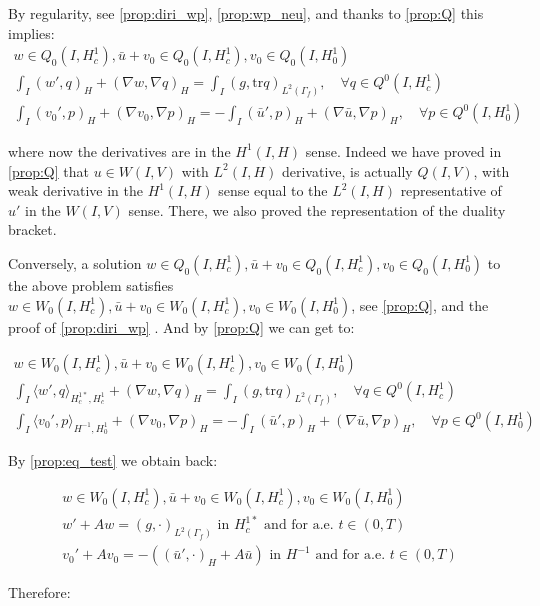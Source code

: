 \documentclass[english,a4paper,12pt,oneside]{scrbook}
\theoremstyle{break}
\theoremstyle{remark}
\newcommand{\tr}{\text{tr}}
\begin{document}
By regularity, see \cref{prop:diri_wp}, \cref{prop:wp_neu}, and thanks to \cref{prop:Q} this implies:
\begin{align*}
w \in Q_0(I, H^1_c), \bar{u}+v_0 \in Q_0(I,H^1_c), v_0 \in Q_0(I,H^1_0) \\
\int_I ( w' , q)_H+ (\nabla w, \nabla q)_H = \int_I(g,\tr q)_{L^2(\Gamma_f)}, \quad \forall q \in Q^0(I, H^1_c) \\
\int_I (v_0',p)_H + (\nabla v_0, \nabla p)_H= -\int_I(\bar{u}',p)_H+(\nabla \bar{u}, \nabla p)_H, \quad \forall p \in Q^0(I, H^1_0) 
\end{align*}

where now the derivatives are in the $H^1(I,H)$ sense. Indeed we have proved in \cref{prop:Q} that $u \in W(I,V)$ with $L^2(I,H)$ derivative, is actually $Q(I,V)$, with weak derivative in the $H^1(I,H)$ sense equal to the $L^2(I,H)$ representative of $u'$ in the $W(I,V)$ sense. There, we also proved the representation of the duality bracket.

Conversely, a solution $w \in Q_0(I, H^1_c), \bar{u}+v_0 \in Q_0(I,H^1_c), v_0 \in Q_0(I,H^1_0) $ to the above problem satisfies $w \in W_0(I, H^1_c), \bar{u}+v_0 \in W_0(I,H^1_c), v_0 \in W_0(I,H^1_0)$, see \cref{prop:Q}, and the proof of \cref{prop:diri_wp} . And by \cref{prop:Q} we can get to:

\begin{align*}
w \in W_0(I, H^1_c), \bar{u}+v_0 \in W_0(I,H^1_c), v_0 \in W_0(I,H^1_0) \\
\int_I \langle w' , q\rangle_{H^{1*}_c,H^1_c}+ (\nabla w, \nabla q)_H = \int_I(g,\tr q)_{L^2(\Gamma_f)}, \quad \forall q \in Q^0(I, H^1_c) \\
\int_I \langle v_0',p\rangle_{H^{-1},H^1_0} + (\nabla v_0, \nabla p)_H= -\int_I(\bar{u}',p)_H+(\nabla \bar{u}, \nabla p)_H, \quad \forall p \in Q^0(I, H^1_0) 
\end{align*}

By \cref{prop:eq_test} we obtain back:

\begin{align*}
w \in W_0(I, H^1_c),\bar{u}+v_0 \in W_0(I,H^1_c), v_0 \in W_0(I,H^1_0)\\
w' + A w = (g,\cdot)_{L^2(\Gamma_f)} \text{ in }H^{1*}_c \text{ and for a.e. } t \in (0,T) \\
v_0' + A v_0 = -((\bar{u}',\cdot)_H+A \bar{u}) \text{ in }H^{-1} \text{ and for a.e. } t \in (0,T) 
\end{align*}

Therefore:
\end{document}
